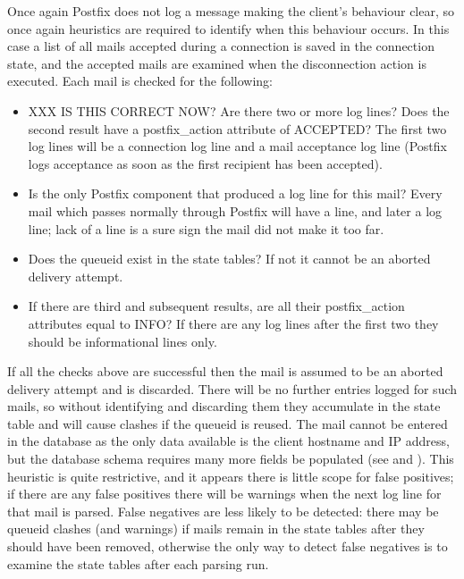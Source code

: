 Once again Postfix does not log a message making the client's behaviour
clear, so once again heuristics are required to identify when this
behaviour occurs.  In this case a list of all mails accepted during a
connection is saved in the connection state, and the accepted mails are
examined when the disconnection action is executed.  Each mail is checked
for the following: 

\begin{itemize}

    \item XXX IS THIS CORRECT NOW\@?\newline{}  Are there two or more
         log lines?  Does the second result have a
        postfix\_action attribute of ACCEPTED\@?  The first two
         log lines will be a connection log line and a mail
        acceptance log line (Postfix logs acceptance as soon as the first
        recipient has been accepted).

    \item Is  the only Postfix component that produced a log
        line for this mail?  Every mail which passes normally through
        Postfix will have a  line, and later a
         log line; lack of a  line is a sure
        sign the mail did not make it too far.  

    \item Does the queueid exist in the state tables?  If not it cannot be
        an aborted delivery attempt.

    \item If there are third and subsequent results, are all their
        postfix\_action attributes equal to INFO\@?  If there are any log
        lines after the first two they should be informational lines only.

\end{itemize}

If all the checks above are successful then the mail is assumed to be an
aborted delivery attempt and is discarded.  There will be no further
entries logged for such mails, so without identifying and discarding them
they accumulate in the state table and will cause clashes if the queueid is
reused.  The mail cannot be entered in the database as the only data
available is the client hostname and \gls{IP} address, but the database
schema requires many more fields be populated (see  and ).  This heuristic is quite
restrictive, and it appears there is little scope for false positives; if
there are any false positives there will be warnings when the next log line
for that mail is parsed.  False negatives are less likely to be detected:
there may be queueid clashes (and warnings) if mails remain in the state
tables after they should have been removed, otherwise the only way to
detect false negatives is to examine the state tables after each parsing
run.

